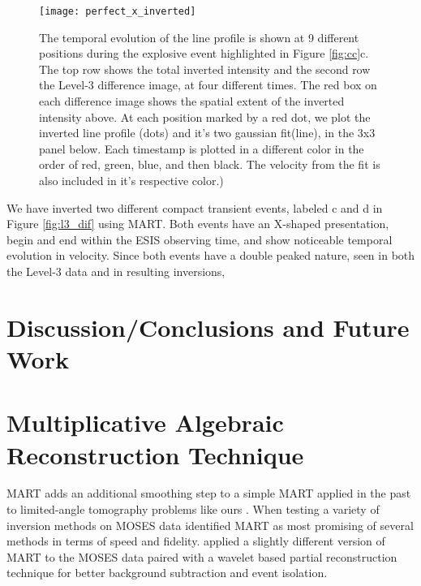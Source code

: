     	\begin{figure}[htb!]
    		\texttt{[image: perfect\_x\_inverted]}
    		\centering
    		\caption{The temporal evolution of the \ov line profile is shown at 9 different positions during the explosive event highlighted in Figure \ref{fig:cc}c. The top row shows the total inverted intensity and the second row the Level-3 difference image, at four different times. The red box on each difference image shows the spatial extent of the inverted intensity above. At each position marked by a red dot, we plot the inverted line profile (dots) and it's two gaussian fit(line), in the 3x3 panel below.  Each timestamp is plotted in a different color in the order of red, green, blue, and then black.  The velocity from the fit is also included in it's respective color.)}
    		\label{fig:perfect_x_inverted}
    	\end{figure}
    	
    	We have inverted two different compact transient events, labeled c and d in Figure \ref{fig:l3_dif} using MART.
    	Both events have an X-shaped presentation, begin and end within the ESIS observing time, and show noticeable temporal evolution in velocity.
    	Since both events have a double peaked nature, seen in both the Level-3 data and in resulting inversions, 
    	
	
    	
    	
    	

    	
    	
    	
    	
    	
    	
    	
    	
    			
    		   	
    	
\section{Discussion/Conclusions and Future Work}





\appendix
\section{Multiplicative Algebraic Reconstruction Technique}\label{MART}
	MART adds an additional smoothing step to a simple MART applied in the past to limited-angle tomography problems like ours \citep{Okamoto1991,Verhoeven1993}.
	When testing a variety of inversion methods on MOSES data \citet{FoxPhD} identified MART as most promising of several methods in terms of speed and fidelity.
	\citet{RustPhD} applied a slightly different version of MART to the MOSES data paired with a wavelet based partial reconstruction technique for better background subtraction and event isolation.
	
